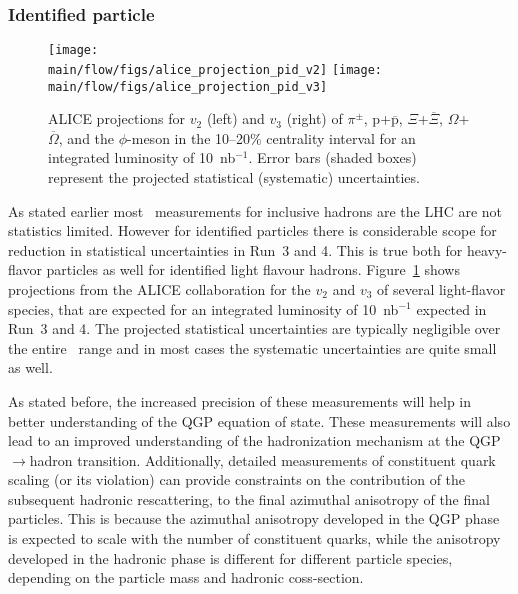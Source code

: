 \subsubsection{Identified particle \vn}\label{sec:identified_particle_vn}


\begin{figure}[!htb]
\begin{center}
\texttt{[image: \\main/flow/figs/alice\_projection\_pid\_v2]}
\texttt{[image: \\main/flow/figs/alice\_projection\_pid\_v3]}
\caption{
ALICE projections for $v_2$ (left) and $v_3$ (right) of $\pi^\pm$, 
  $\mathrm{p}$+$\overline{\mathrm{p}}$, $\Xi$+$\overline{\Xi}$, 
  $\Omega$+$\overline{\Omega}$, and the $\phi$-meson 
  in the 10--20\% centrality interval
  for an integrated luminosity of 10~nb$^{-1}$. 
Error bars (shaded boxes) represent the projected statistical 
  (systematic) uncertainties.}
\label{fig:alice_vn}
\end{center}
\end{figure}

As stated earlier most \vn\ measurements for inclusive hadrons are the LHC 
  are not statistics limited.
However for identified particles there is considerable scope for reduction 
  in statistical uncertainties in Run~3 and 4.
This is true both for heavy-flavor particles 
  as well for identified light flavour hadrons.
Figure~\ref{fig:alice_vn} shows projections from the ALICE collaboration for 
  the $v_2$ and $v_3$ of several light-flavor species, that are expected for 
  an integrated luminosity of 10~nb$^{-1}$ expected in Run~3 and 4.
The projected statistical uncertainties are typically negligible over the 
  entire \pt\ range and in most cases the systematic uncertainties are 
  quite small as well.

As stated before, the increased precision of these measurements will help in 
  better understanding of the QGP equation of state. 
These measurements will also lead to an improved understanding 
  of the hadronization mechanism at the QGP$\rightarrow$hadron transition.
Additionally, detailed measurements of constituent quark scaling (or its violation)
  can provide constraints on the contribution of the subsequent hadronic 
  rescattering, to the final azimuthal anisotropy of the final particles.
This is because the azimuthal anisotropy developed in the QGP phase 
  is expected to scale with the 
  number of constituent quarks, while the anisotropy developed in the hadronic
  phase is different for different particle species, depending on the particle 
  mass and hadronic coss-section.


